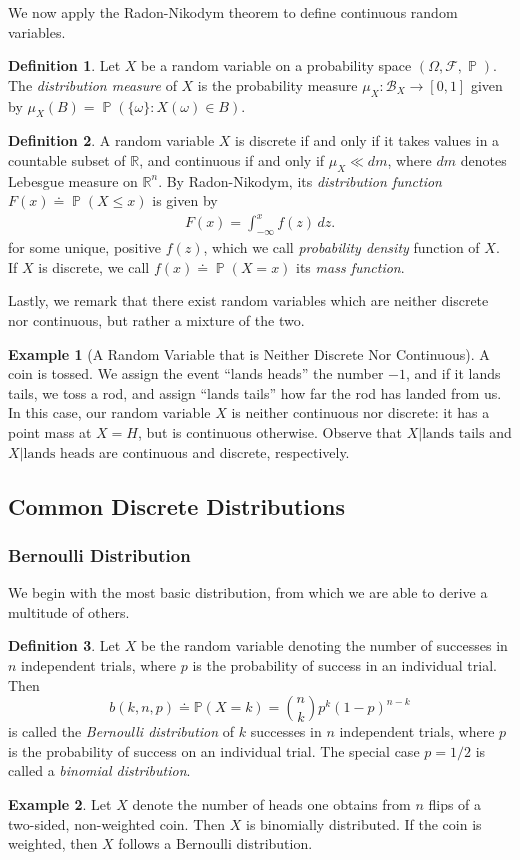 \documentclass[12pt]{article}
\newcommand{\rr}{\mathbb{R}}
\newcommand{\filter}{\mathcal{F}}
\newcommand{\borel}{\mathcal{B}}
\DeclareMathOperator{\prob}{\mathbb{P}}
\theoremstyle{plain}
\theoremstyle{definition}
\newtheorem*{definition}{Definition}
\newtheorem*{example}{Example}
\theoremstyle{remark}
\numberwithin{equation}{section}  %
\begin{document}
We now apply the Radon-Nikodym theorem to define continuous random variables.
\begin{definition}
	Let $X$ be a random variable on a probability space $(\Omega, \filter, 
	\prob)$. 
	The \emph{distribution measure} of $X$ is the probability measure $\mu_X:
	\borel_X \to [0,1]$ given by $\mu_X(B) = \prob(\{\omega\}: X(\omega) \in 
	B)$.
\end{definition}
\begin{definition}
	A random variable $X$ is discrete if and only if it takes values in a 
	countable
	subset of $\rr$, and continuous if and only if $\mu_X \ll dm$, where $dm$
	denotes Lebesgue measure on $\rr^n$. By Radon-Nikodym, its 
	\emph{distribution
	function} $F(x) \doteq \prob(X \le x)$ is given by
	\begin{align*}
		F(x) = \int_{-\infty}^x f(z) \,dz.
	\end{align*}
	for some unique, positive $f(z)$, which we call \emph{probability density}
	function of $X$.
	If $X$ is discrete, we call
	$f(x) \doteq \prob(X = x)$ its \emph{mass function}.
\end{definition}
Lastly, we remark that there exist random variables which are neither
discrete nor continuous, but rather a mixture of the two.
\begin{example}[A Random Variable that is Neither Discrete Nor Continuous]
	A coin is tossed. We assign the event ``lands heads'' the number $-1$, and 
	if it lands tails, we toss a rod, and assign ``lands tails'' how far the 
	rod has
	landed from us. In this case, our random variable $X$ is neither continuous 
	nor
	discrete: it has a point mass at $X = H$, but is continuous otherwise.
	Observe that $X | \text{lands tails}$ and $X | \text{lands heads}$ are
	continuous and discrete, respectively.
\end{example}
\subsection{Common Discrete Distributions}
\subsubsection{Bernoulli Distribution}
We begin with the most basic distribution, from which
we are able to derive a multitude of others.
\begin{definition}
	Let $X$ be the random variable denoting the number of successes
	in $n$ independent trials, where $p$ is the probability of success in
	an individual trial. Then
	\begin{equation*}
		b(k, n, p) \doteq \mathbb{P}(X = k) = \binom{n}{k} p^k {(1 - p)}^{n-k}
	\end{equation*}
	is called the \emph{Bernoulli distribution} of $k$ successes
	in $n$ independent trials, where $p$ is the probability of success on an
	individual trial. The special case
	$p = 1/2$ is called a \emph{binomial distribution}.
\end{definition}
\begin{example}
	Let $X$ denote the number of heads one obtains from $n$ flips of a
	two-sided, non-weighted coin. Then $X$ is binomially distributed.
	If the coin is weighted, then $X$ follows a Bernoulli distribution.
\end{example}
\end{document}
